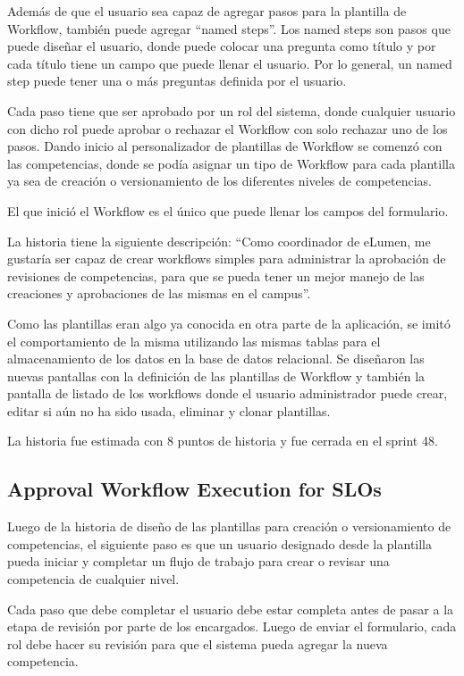 Además de que el usuario sea capaz de agregar pasos para la plantilla de Workflow, también puede agregar “named steps”. Los named steps son pasos que puede diseñar el usuario, donde puede colocar una pregunta como título y por cada título tiene un campo que puede llenar el usuario. Por lo general, un named step puede tener una o más preguntas definida por el usuario.

Cada paso tiene que ser aprobado por un rol del sistema, donde cualquier usuario con dicho rol puede aprobar o rechazar el Workflow con solo rechazar uno de los pasos. Dando inicio al personalizador de plantillas de Workflow se comenzó con las competencias, donde se podía asignar un tipo de Workflow para cada plantilla ya sea de creación o versionamiento de los diferentes niveles de competencias.

El que inició el Workflow es el único que puede llenar los campos del formulario.

La historia tiene la siguiente descripción: “Como coordinador de eLumen, me gustaría ser capaz de crear workflows simples para administrar la aprobación de revisiones de competencias, para que se pueda tener un mejor manejo de las creaciones y aprobaciones de las mismas en el campus”.

Como las plantillas eran algo ya conocida en otra parte de la aplicación, se imitó el comportamiento de la misma utilizando las mismas tablas para el almacenamiento de los datos en la base de datos relacional. Se diseñaron las nuevas pantallas con la definición de las plantillas de Workflow y también la pantalla de listado de los workflows donde el usuario administrador puede crear, editar si aún no ha sido usada, eliminar y clonar plantillas.

La historia fue estimada con 8 puntos de historia y fue cerrada en el sprint 48.

\subsection{Approval Workflow Execution for SLOs}
Luego de la historia de diseño de las plantillas para creación o versionamiento de competencias, el siguiente paso es que un usuario designado desde la plantilla pueda iniciar y completar un flujo de trabajo para crear o revisar una competencia de cualquier nivel.

Cada paso que debe completar el usuario debe estar completa antes de pasar a la etapa de revisión por parte de los encargados. Luego de enviar el formulario, cada rol debe hacer su revisión para que el sistema pueda agregar la nueva competencia.


